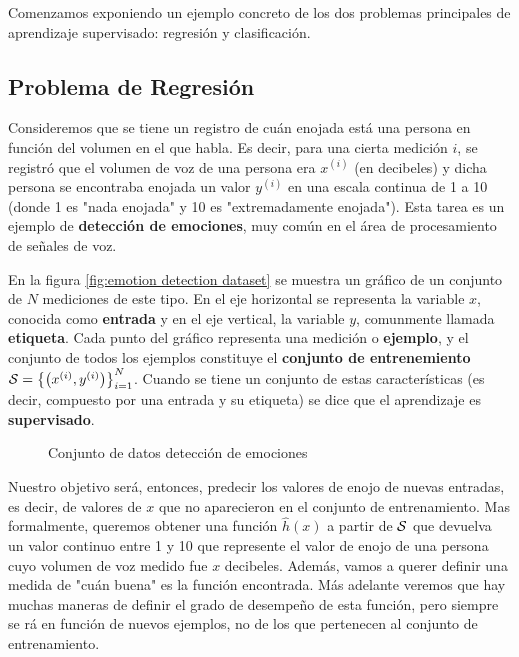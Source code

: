Comenzamos exponiendo un ejemplo concreto de los dos problemas principales de aprendizaje supervisado: regresión y clasificación.

\subsection{Problema de Regresión}

Consideremos que se tiene un registro de cuán enojada está una persona en función del volumen en el que habla. Es decir, para una cierta medición $i$, se registró que el volumen de voz de una persona era $x^{(i)}$ (en decibeles) y dicha persona se encontraba enojada un valor $y^{(i)}$ en una escala continua de 1 a 10 (donde 1 es "nada enojada" y 10 es "extremadamente enojada"). Esta tarea es un ejemplo de \textbf{detección de emociones}, muy común en el área de procesamiento de señales de voz.

En la figura \ref{fig:emotion detection dataset} se muestra un gráfico de un conjunto de $N$ mediciones de este tipo. En el eje horizontal se representa la variable $x$, conocida como \textbf{entrada} y en el eje vertical, la variable $y$, comunmente llamada \textbf{etiqueta}. Cada punto del gráfico representa una medición o \textbf{ejemplo}, y el conjunto de todos los ejemplos constituye el \textbf{conjunto de entrenemiento} $\mathcal{S} = {\left\lbrace \left( {x}^{(i)},{y}^{(i)} \right) \right\rbrace}_{i=1}^N$. Cuando se tiene un conjunto de estas características (es decir, compuesto por una entrada y su etiqueta) se dice que el aprendizaje es \textbf{supervisado}.

\begin{figure}[h]
\centering
\caption{Conjunto de datos detección de emociones}
\label{fig:emotion detection dataset regression}
\end{figure}

Nuestro objetivo será, entonces, predecir los valores de enojo de nuevas entradas, es decir, de valores de $x$ que no aparecieron en el conjunto de entrenamiento. Mas formalmente, queremos obtener una función $\hat{h}(x)$ a partir de $\mathcal{S}$ que devuelva un valor continuo entre 1 y 10 que represente el valor de enojo de una persona cuyo volumen de voz medido fue $x$ decibeles. Además, vamos a querer definir una medida de "cuán buena" es la función encontrada. Más adelante  veremos que hay muchas maneras de definir el grado de desempeño de esta función, pero siempre se rá en función de nuevos ejemplos, no de los que pertenecen al conjunto de entrenamiento.


